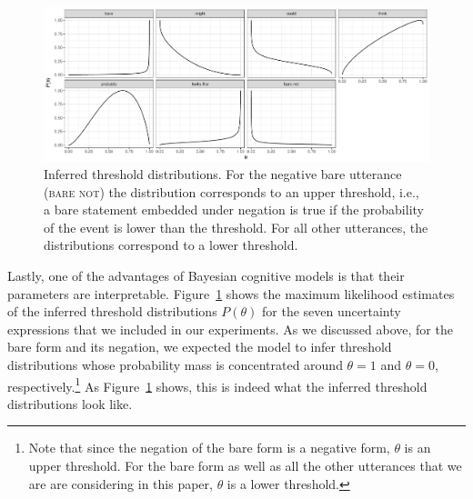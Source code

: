 \documentclass[lucida,biblatex]{sp} %
\begin{document}
\begin{figure}
\includegraphics[width=\textwidth]{plots/threshold-distributions-prior.pdf}
\caption{Inferred threshold distributions. For the negative bare utterance (\textsc{bare not}) the distribution corresponds to an upper threshold, i.e., a bare statement embedded under negation is true if the probability of the event is lower than the threshold. For all other utterances, the distributions correspond to a lower threshold.
\label{fig:threshold-distributions}}
\end{figure}

Lastly, one of the advantages of Bayesian cognitive models is that their parameters are interpretable. Figure~\ref{fig:threshold-distributions} shows the 
maximum likelihood estimates of the inferred threshold distributions $P(\theta)$ for the seven uncertainty expressions that we included in our experiments.
As we discussed above, for the bare form and its negation, we expected the model to infer threshold distributions whose probability mass is concentrated 
around $\theta=1$ and $\theta=0$, respectively.\footnote{Note that since the negation of the bare form is a negative form, $\theta$ is an upper threshold. For the bare form as well as
all the other utterances that we are are considering in this paper, $\theta$ is a lower threshold.} As  Figure~\ref{fig:threshold-distributions} shows, this is indeed what
the inferred threshold distributions look like. 
\end{document}
